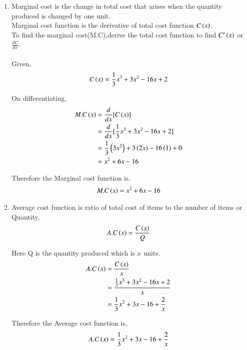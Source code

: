 \documentclass[journal,12pt,twocolumn]{IEEEtran}
\begin{document}
     \begin{enumerate}[ label=(\roman*)]
    \item Marginal cost is the change in total cost that arises when the quantity produced is changed by one unit. \\
          Marginal cost function is the derivative of total cost function $C\left(x\right)$.\\
          To find the marginal cost(M.C),derive the total cost function to find $C^{\prime}\left(x\right)$ or $\frac{dC}{dx}$. \\\\
          
      Given,
          \begin{align}
            C\left(x\right) = \frac{1}{3}x^3 + 3x^2 - 16x +2
          \end{align}
          
      On differentiating,
          \begin{align}
            M.C\left(x\right) &= \frac{d}{dx} [C\left(x\right)]
            \\
            &= \frac{d}{dx} [\frac{1}{3}x^3 + 3x^2 - 16x +2] 
            \\
            &= \frac{1}{3}\left(3x^2\right) + 3\left(2x\right)-16\left(1\right)+0 
            \\
            &= x^2+6x-16
          \end{align}  
          
      Therefore the Marginal cost function is,
          \begin{align*}
            M.C\left(x\right)=x^2+6x-16
          \end{align*}        
      
    \item Average cost function is ratio of total cost of items to the number of items or Quantity,
         \begin{align}
           A.C\left(x\right)=\frac{C\left(x\right)}{Q}
         \end{align}
         
    Here Q is the quantity produced which is $x$ units.
        \begin{align}
          A.C\left(x\right) &=\frac{C\left(x\right)}{x} 
          \\
          &=\frac{\frac{1}{3}x^3 + 3x^2 - 16x +2}{x} 
          \\
          &=\frac{1}{3}x^2 + 3x - 16 +\frac{2}{x}
        \end{align}    
               
    Therefore the Average cost function is,
         \begin{align*}
           A.C\left(x\right)=\frac{1}{3}x^2 + 3x - 16 +\frac{2}{x}
         \end{align*}
         
   \end{enumerate}
   
\end{document}
